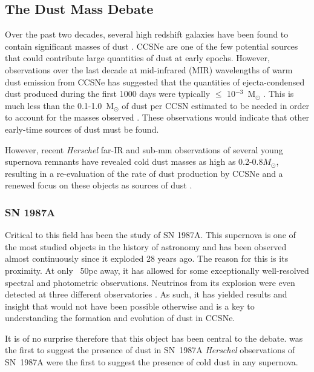 \subsection{The Dust Mass Debate}

Over the past two decades, several high redshift galaxies  have been found to contain significant masses of dust \citep{Omont2001, Bertoldi2003, Watson2015}.  CCSNe are one of the few potential sources that could contribute large quantities of dust at early epochs. However, 
observations over the last decade at mid-infrared (MIR) wavelengths of 
warm dust emission from CCSNe has suggested that the quantities of ejecta-condensed dust 
produced during the first 1000 days were typically $\leq$ 10$^{-3}$~M$_\odot$  
\citep{Sugerman2006, Meikle2007, Kotak2009, Andrews2010, Fabbri2011}.  This is much less than the 0.1-1.0~M$_\odot$ of dust per CCSN  
estimated to be needed  in order to account for the masses observed \citep{Morgan2003, Dwek2007}.  These observations would indicate that other early-time sources of dust must be found.

 However, recent {\em Herschel} far-IR and sub-mm observations of  several young supernova remnants have revealed cold dust  masses as high as 
0.2-0.8$M_{\odot}$, resulting in a 
re-evaluation of the rate of dust production by CCSNe and a renewed focus on these objects as sources of dust \citep{Barlow2010, 
Matsuura2011, Gomez2012}.

\subsubsection{SN 1987A}



Critical to this field has been the study of SN 1987A.   This supernova is one of the most studied objects in the history of astronomy and has been observed almost continuously since it exploded 28 years ago.  The reason for this is its proximity.  At only ~50pc away, it has allowed for some exceptionally well-resolved spectral and photometric observations.  Neutrinos from its explosion were even detected at three different observatories .  As such, it has yielded results and insight that would not have been possible otherwise and is a key to understanding the formation and evolution of dust in CCSNe.

It is of no surprise therefore that this object has been central to the debate.  \citet{Lucy1989} was the first to suggest the presence of dust in SN~1987A {\em Herschel} observations of SN~1987A were the first to suggest the presence of cold dust in any supernova.



